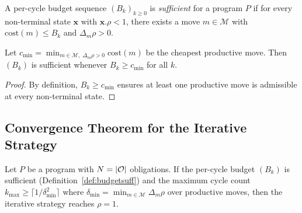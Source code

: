 \documentclass[11pt]{article}
\newcommand{\xstate}{\mathbf{x}}           %
\newcommand{\vcov}{\rho}                   %
\newcommand{\moves}{\mathcal{M}}           %
\begin{document}
\begin{definition}
  \label{def:budgetsuff}
  A per-cycle budget sequence $(B_k)_{k \geq 0}$ is \emph{sufficient}
  for a program $P$ if for every non-terminal state $\xstate$ with
  $\xstate.\vcov < 1$, there exists a move $m \in \moves$ with
  $\mathrm{cost}(m) \leq B_k$ and $\Delta_m\vcov > 0$.
\end{definition}

\begin{lemma}
  \label{lem:minbudget}
  Let $c_{\min} = \min_{m \in \moves,\; \Delta_m\vcov > 0}
  \mathrm{cost}(m)$ be the cheapest productive move.  Then $(B_k)$ is
  sufficient whenever $B_k \geq c_{\min}$ for all $k$.
\end{lemma}
\begin{proof}
  By definition, $B_k \geq c_{\min}$ ensures at least one productive
  move is admissible at every non-terminal state.
\end{proof}

\subsection{Convergence Theorem for the Iterative Strategy}

\begin{theorem}
  \label{thm:iterconv}
  Let $P$ be a program with $N = |\mathcal{O}|$ obligations.  If the
  per-cycle budget $(B_k)$ is sufficient
  (Definition~\ref{def:budgetsuff}) and the maximum cycle count
  $k_{\max} \geq \lceil 1/\delta_{\min}^2 \rceil$ where
  $\delta_{\min} = \min_{m \in \moves} \Delta_m\vcov$ over productive
  moves, then the iterative strategy reaches $\vcov = 1$.
\end{theorem}
\end{document}
